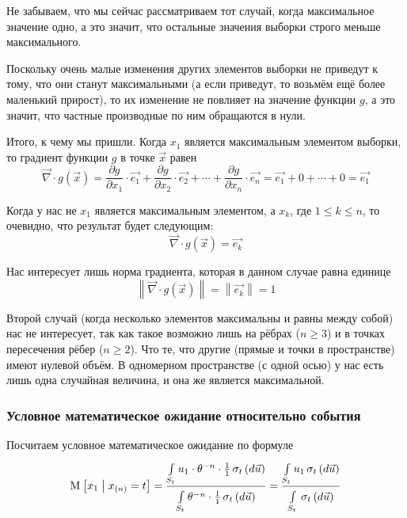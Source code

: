 Не забываем, что мы сейчас рассматриваем тот случай,
когда максимальное значение одно, а это значит,
что остальные значения выборки строго меньше максимального.

Поскольку очень малые изменения других элементов выборки не приведут к тому,
что они станут максимальными (а если приведут, то возьмём ещё более
маленький прирост), то их изменение не повлияет на значение функции $g$,
а это значит, что частные производные по ним обращаются в нули.

Итого, к чему мы пришли.
Когда $x_1$ является максимальным элементом выборки,
то градиент функции $g$ в точке $\vec{x}$ равен
$$\vec{\nabla} \cdot g\left( \vec{x} \right)
  = \frac{\partial g}{\partial x_1} \cdot \vec{e_1}
      + \frac{\partial g}{\partial x_2} \cdot \vec{e_2}
      + \cdots
      + \frac{\partial g}{\partial x_n} \cdot \vec{e_n}
  = \vec{e_1} + 0 + \cdots + 0 = \vec{e_1}$$

Когда у нас не $x_1$ является максимальным элементом, а $x_k$,
где $1 \le k \le n$, то очевидно, что результат будет следующим:
$$\vec{\nabla} \cdot g\left( \vec{x} \right) = \vec{e_k}$$

Нас интересует лишь норма градиента, которая в данном случае равна единице
$$\left\| \vec{\nabla} \cdot g\left( \vec{x} \right) \right\|
  = \left\| \vec{e_k} \right\| = 1$$

Второй случай (когда несколько элементов максимальны и равны между собой)
нас не интересует, так как такое возможно лишь на рёбрах ($n \ge 3$) и в точках
пересечения рёбер ($n \ge 2$).
Что те, что другие (прямые и точки в пространстве) имеют нулевой объём.
В одномерном пространстве (с одной осью) у нас есть лишь одна
случайная величина, и она же является максимальной.

\subsubsection{Условное математическое ожидание относительно события}
Посчитаем условное математическое ожидание по формуле
\begin{align*}
  \Mean{x_1 \mcond x_{\left( n \right)} = t}
      = \frac{\integrall{S_t}{
    \sigma_{t}\left(d\vec{u} \right)}{
    u_1 \cdot \theta^{-n} \cdot \frac{1}{1}}}
      {\integrall{S_t}{\sigma_{t}\left(d\vec{u} \right)}{
    \theta^{-n} \cdot \frac{1}{1}}}
      = \frac{\integrall{S_t}{
    \sigma_{t}\left(d\vec{u} \right)}{u_1}}{
      \integrall{S_t}{
    \sigma_{t}\left(d\vec{u} \right)}{}}
\end{align*}

